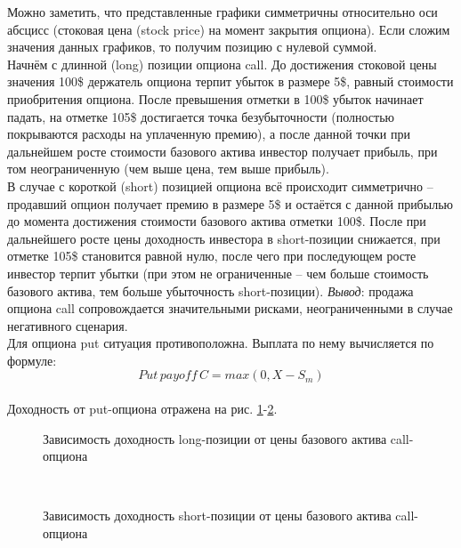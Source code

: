 \documentclass{article}
\begin{document}
Можно заметить, что представленные графики симметричны относительно оси абсцисс (стоковая цена (stock price) на момент закрытия опциона). Если сложим значения данных графиков, то получим позицию с нулевой суммой.\\
Начнём с длинной (long) позиции опциона call. До достижения стоковой цены значения 100\$ держатель опциона терпит убыток в размере 5\$, равный стоимости приобритения опциона. После превышения отметки в 100\$ убыток начинает падать, на отметке 105\$ достигается точка безубыточности (полностью покрываются расходы на уплаченную премию), а после данной точки при дальнейшем росте стоимости базового актива инвестор получает прибыль, при том неограниченную (чем выше цена, тем выше прибыль).\\
В случае с короткой (short) позицией опциона всё происходит симметрично -- продавший опцион получает премию в размере 5\$ и остаётся с данной прибылью до момента достижения стоимости базового актива отметки 100\$. После при дальнейшего росте цены доходность инвестора в short-позиции снижается, при отметке 105\$ становится равной нулю, после чего при последующем росте инвестор терпит убытки (при этом не ограниченные -- чем больше стоимость базового актива, тем больше убыточность short-позиции). \textit{Вывод}: продажа опциона call сопровождается значительными рисками, неограниченными в случае негативного сценария.\\
Для опциона put ситуация противоположна. Выплата по нему вычисляется по формуле:
\[Put\,payoff \,C = max(0, X - S_m)\]\\
Доходность от put-опциона отражена на рис. \ref{pic3_long_put_price}-\ref{pic4_long_put_price}.\\
\begin{figure}[h]
    \caption{Зависимость доходность long-позиции от цены базового актива call-опциона}
    \label{pic3_long_put_price}
\end{figure}\\
\begin{figure}[h]
    \caption{Зависимость доходность short-позиции от цены базового актива call-опциона}
    \label{pic4_long_put_price}
\end{figure}\\
\end{document}
